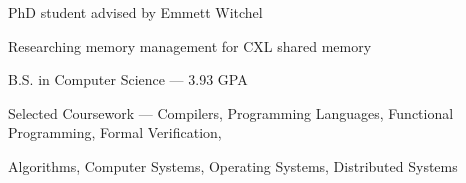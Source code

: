 \documentclass{resume}
\begin{document}
\begin{education}
    \begin{description}
        \item PhD student advised by Emmett Witchel
        \item Researching memory management for CXL shared memory
    \end{description}

    \begin{description}
        \item B.S. in Computer Science --- 3.93 GPA
        \item Selected Coursework ---
            Compilers,
            Programming Languages,
            Functional Programming,
            Formal Verification,

            Algorithms,
            Computer Systems,
            Operating Systems,
            Distributed Systems
    \end{description}
\end{education}
\end{document}
